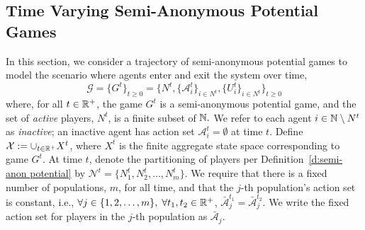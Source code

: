 \subsection{Time Varying Semi-Anonymous Potential Games}

In this section, we consider a trajectory of semi-anonymous potential games to model the scenario where agents enter and exit the system over time,
$$\mathcal{G} = \{G^t\}_{t\geq 0} =  \{N^t,\{\mathcal{A}_i^t\}_{i\in N^t},\{U_i^t\}_{i\in N^t}\}_{t\geq 0}$$
where, for all $t\in \mathbb{R}^+$, the game $G^t$ is a semi-anonymous potential game, and the set of {\it active} players, $N^t$, is a finite subset of $\mathbb{N}.$  We refer to each agent $i\in \mathbb{N}\setminus N^t$ as {\it inactive}; an inactive agent has action set $\mathcal{A}_i^t = \emptyset$ at time $t$. Define ${\mathcal X} :=\cup_{t\in \mathbb{R}^+}X^t$, where $X^t$ is the finite aggregate state space corresponding to game $G^t.$
At time $t$, denote the partitioning of players per Definition~\ref{d:semi-anon potential}  by $\mathcal{N}^t = \{N_1^t,N_2^t,\ldots,N_m^t\}$. We require that there is a fixed number of populations, $m$, for all time, and that the $j$-th population's action set is constant, i.e., $\forall j\in \{1,2,\ldots,m\},\;\forall t_1, t_2 \in \mathbb{R}^+$, $\bar{\mathcal{A}}^{t_1}_j = \bar{\mathcal{A}}^{t_2}_j.$ We write the fixed action set for players in the $j$-th population as  $\bar{\mathcal{A}}_j$. 



